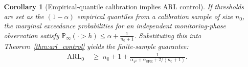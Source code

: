 \documentclass{article}
\theoremstyle{plain}
\newtheorem{corollary}[theorem]{Corollary}
\theoremstyle{definition}
\theoremstyle{remark}
\begin{document}
\begin{corollary}[Empirical-quantile calibration implies ARL control]\label{cor:arl_empquant}
If thresholds are set as the $(1-\alpha)$ empirical quantiles from a calibration sample of size $n_0$, the marginal exceedance probabilities for an independent monitoring-phase observation satisfy $\mathbb P_{\infty}(\cdot > h) \le \alpha + \frac{1}{n_0+1}$. 
Substituting this into Theorem~\ref{thm:arl_control} yields the finite-sample guarantee:\begin{align*}
\mathrm{ARL}_0 \;&\ge\; n_0+1+\frac{1}{\alpha_{T^2}+\alpha_{\mathrm{SPE}}+2/(n_0+1)}.
\end{align*}\end{corollary}
\end{document}
